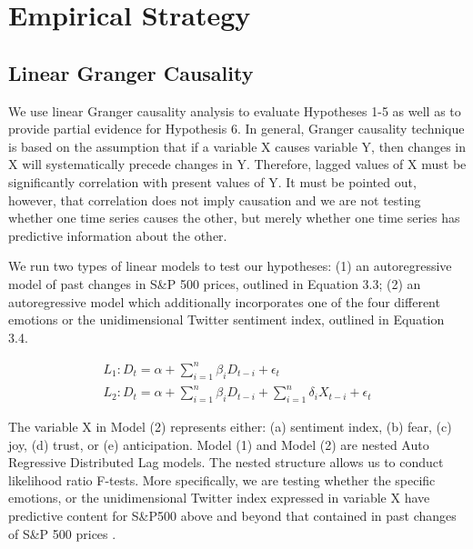 \section{Empirical Strategy}
\subsection{Linear Granger Causality}

We use linear Granger causality analysis to evaluate Hypotheses 1-5 as well as to provide partial evidence for Hypothesis 6. In general, Granger causality technique is based on the assumption that if a variable X causes variable Y, then changes in X will systematically
precede changes in Y. Therefore, lagged
values of X must be significantly correlation
with present values of Y. It must be pointed out, however, that correlation does not imply causation and we are not testing whether one time series causes the other, but merely whether one time series has predictive information about the other.

We run two types of linear models to test our hypotheses: 
(1) an autoregressive model of past changes in S&P 500 prices, outlined in Equation 3.3; 
(2) an autoregressive model which additionally incorporates one of the four different emotions or the unidimensional Twitter sentiment index, outlined in Equation 3.4.\\
\begin{ceqn}
\begin{align}
L_1:D_t = \alpha + \sum_{i=1}^{n}{\beta_iD_{t-i} + \epsilon_t}\\ 
L_2:D_t = \alpha + \sum_{i=1}^{n}{\beta_iD_{t-i} + \sum_{i=1}^{n}{\delta_iX_{t-i}} + \epsilon_t} 
\end{align}
\end{ceqn}

The variable X in Model (2) represents either: (a) sentiment index, (b) fear, (c) joy, (d) trust, or (e) anticipation. Model (1) and Model (2) are nested Auto Regressive Distributed Lag models. The nested structure allows us to conduct likelihood ratio F-tests. More specifically, we are testing whether the specific emotions, or the unidimensional Twitter index expressed in variable X have predictive content for S&P500 above and beyond that contained in past changes of S&P 500 prices \parencite{kirchgassner2012introduction}. 

